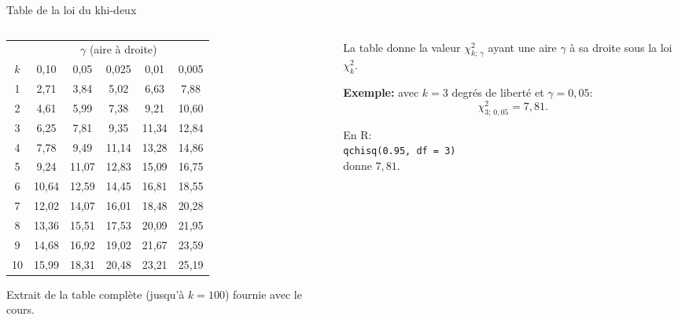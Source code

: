 \documentclass{BeamerTemplate}
\begin{document}
\begin{frame}[t]{Table de la loi du khi-deux}

\begin{columns}[T]
\begin{column}{0.56\textwidth}
\centering
\footnotesize
\renewcommand{\arraystretch}{1.12}
\begin{tabular}{c|ccccc}
 & \multicolumn{5}{c}{$\gamma$ (aire à droite)}\\
$k$ & 0{,}10 & 0{,}05 & 0{,}025 & 0{,}01 & 0{,}005\\
\hline
1 & 2{,}71 & 3{,}84 & 5{,}02 & 6{,}63 & 7{,}88\\
2 & 4{,}61 & 5{,}99 & 7{,}38 & 9{,}21 & 10{,}60\\
3 & 6{,}25 & \colorbox{burntorange!30}{7{,}81} & 9{,}35 & 11{,}34 & 12{,}84\\
4 & 7{,}78 & 9{,}49 & 11{,}14 & 13{,}28 & 14{,}86\\
5 & 9{,}24 & 11{,}07 & 12{,}83 & 15{,}09 & 16{,}75\\
6 & 10{,}64 & 12{,}59 & 14{,}45 & 16{,}81 & 18{,}55\\
7 & 12{,}02 & 14{,}07 & 16{,}01 & 18{,}48 & 20{,}28\\
8 & 13{,}36 & 15{,}51 & 17{,}53 & 20{,}09 & 21{,}95\\
9 & 14{,}68 & 16{,}92 & 19{,}02 & 21{,}67 & 23{,}59\\
10 & 15{,}99 & 18{,}31 & 20{,}48 & 23{,}21 & 25{,}19\\
\end{tabular}

\smallskip
{\scriptsize Extrait de la table complète (jusqu'à $k=100$) fournie avec le cours.}
\end{column}
\begin{column}{0.42\textwidth}
\small
La table donne la valeur $\chi^2_{k;\,\gamma}$ ayant une aire $\gamma$
\alert{à sa droite} sous la loi $\chi^2_k$.

\bigskip
\textbf{Exemple:} avec $k=3$ degrés de liberté et $\gamma=0{,}05$:
\[
\chi^2_{3;\,0{,}05}=7{,}81.
\]

\medskip
En R:\\ \texttt{qchisq(0.95, df = 3)}\\ donne $7{,}81$.
\end{column}
\end{columns}

\end{frame}
\end{document}
